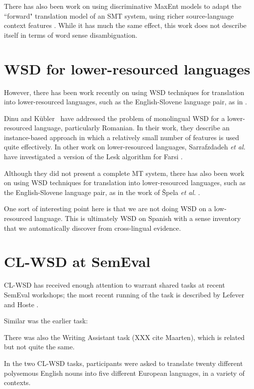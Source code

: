 There has also been work on using discriminative MaxEnt models to adapt
the ``forward" translation model of an SMT system, using richer
source-language context features \cite{vzabokrtsky-popel-marevcek:2010:WMT}.
While it has much the same effect, this work does not describe itself in terms
of word sense disambiguation.




\section{WSD for lower-resourced languages}
However, there has been work recently on using WSD techniques for translation
into lower-resourced languages, such as the English-Slovene language pair, as
in \cite{vintar-fivser-vrvsvcaj:2012:ESIRMT-HyTra2012}. 

Dinu and Kübler~\cite{Dinu07} have addressed the problem of monolingual WSD for
a lower-resourced language, particularly Romanian. In their work, they describe
an instance-based approach in which a relatively small number of features is
used quite effectively. In other work on lower-resourced languages,
Sarrafzdadeh \textit{et al.} have investigated a version of the Lesk algorithm
for Farsi \cite{sarrafzdadeh}.

Although they did not present a complete MT system, there has also been work
on using WSD techniques for translation into lower-resourced languages, such as
the English-Slovene language pair, as in
the work of \v{S}pela \emph{et al.}
\cite{vintar-fivser-vrvsvcaj:2012:ESIRMT-HyTra2012}. 

One sort of interesting point here is that we are not doing WSD on a
low-resourced language. This is ultimately WSD on Spanish with a sense
inventory that we automatically discover from cross-lingual evidence.


\section{CL-WSD at SemEval}
CL-WSD has received enough attention to warrant shared tasks at recent SemEval
workshops; the most recent running of the task is described by Lefever and
Hoste \cite{task10}.

Similar was the earlier task: \cite{lefever-hoste:2009:SEW}

There was also the Writing Assistant task (XXX cite Maarten), which is related
but not quite the same.

In the two CL-WSD tasks, participants were asked to translate twenty different
polysemous English nouns into five different European languages, in a variety
of contexts.

